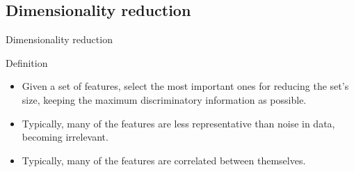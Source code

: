 \documentclass[xcolor=x11names,compress,10pt]{beamer}
\renewcommand{\(}{\begin{columns}}
\renewcommand{\)}{\end{columns}}
\newcommand{\<}[1]{\begin{column}{#1}}
\renewcommand{\>}{\end{column}}
\begin{document}
\subsection{Dimensionality reduction}
\begin{frame}{Dimensionality reduction}
\begin{block}{Definition}
\begin{itemize}
	\item Given a set of features, select the most important ones for reducing the set's size, keeping the maximum discriminatory information as possible.
	\item Typically, many of the features are less representative than noise in data, becoming irrelevant.
	\item Typically, many of the features are correlated between themselves.
\end{itemize}
\end{block}
\end{frame}
\end{document}
